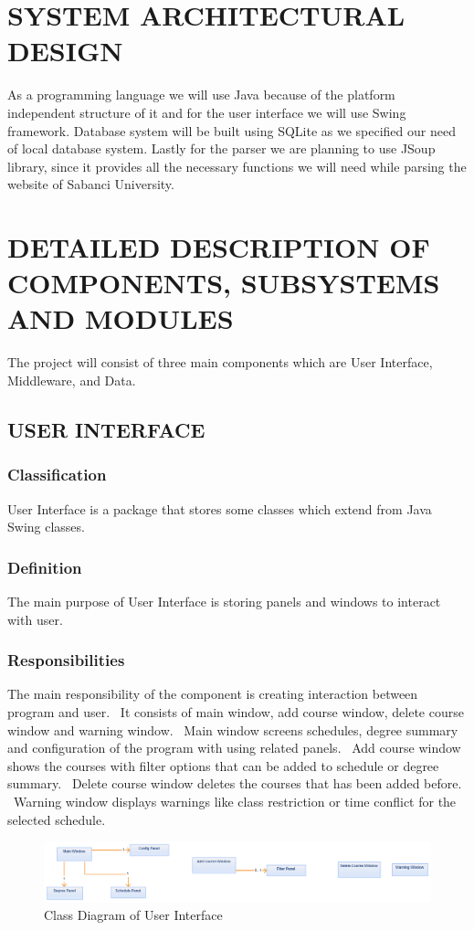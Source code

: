 \documentclass[twoside,letterpaper]{article}
\begin{document}
\clearpage\pagestyle{Standard}
\section{SYSTEM ARCHITECTURAL DESIGN}
\label{sec:architecture}


As a programming language we will use Java because of the platform independent structure of it and for the user interface we will use Swing framework. Database system will be built using SQLite as we specified our need of local database system. Lastly for the parser we are planning to use JSoup library, since it provides all the necessary functions we will need while parsing the website of Sabanci University.

\clearpage\pagestyle{Standard}
\section{DETAILED DESCRIPTION OF COMPONENTS, SUBSYSTEMS AND MODULES}
\label{sec:description}

The project will consist of three main components which are User Interface, Middleware, and Data.

\subsection{USER INTERFACE}
\subsubsection{Classification}
User Interface is a package that stores some classes which extend from Java Swing classes. 
\subsubsection{Definition}
The main purpose of User Interface is storing panels and windows to interact with user.
\subsubsection{Responsibilities}
The main responsibility of the component is creating interaction between program and user. \ It 
consists of main window, add course window, delete course window and warning window. \ Main window 
screens schedules, degree summary and configuration of the program with using related panels. \ Add 
course window shows the courses with filter options that can be added to schedule or degree summary. 
\ Delete course window deletes the courses that has been added before. \ Warning window displays 
warnings like class restriction or time conflict for the selected schedule.
\begin{figure}[h]
\centering
\includegraphics[width=\linewidth]{ui.png}
\caption{Class Diagram of User Interface}
\end{figure}
\end{document}
